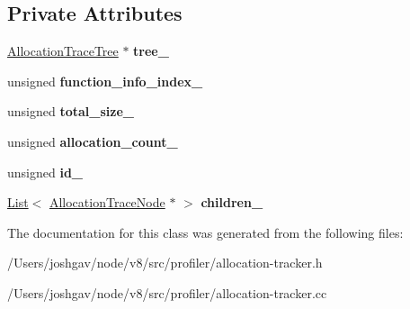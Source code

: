 \subsection*{Private Attributes}
\begin{DoxyCompactItemize}
\item 
\hyperlink{classv8_1_1internal_1_1_allocation_trace_tree}{Allocation\+Trace\+Tree} $\ast$ {\bfseries tree\+\_\+}\hypertarget{classv8_1_1internal_1_1_allocation_trace_node_a1e3fa25a87aaa44042b54073123edc7b}{}\label{classv8_1_1internal_1_1_allocation_trace_node_a1e3fa25a87aaa44042b54073123edc7b}

\item 
unsigned {\bfseries function\+\_\+info\+\_\+index\+\_\+}\hypertarget{classv8_1_1internal_1_1_allocation_trace_node_a70d789a2c7edffb1f96b0d9d539e6210}{}\label{classv8_1_1internal_1_1_allocation_trace_node_a70d789a2c7edffb1f96b0d9d539e6210}

\item 
unsigned {\bfseries total\+\_\+size\+\_\+}\hypertarget{classv8_1_1internal_1_1_allocation_trace_node_a25c93ade36d5ce7dd45eb65dee6c168f}{}\label{classv8_1_1internal_1_1_allocation_trace_node_a25c93ade36d5ce7dd45eb65dee6c168f}

\item 
unsigned {\bfseries allocation\+\_\+count\+\_\+}\hypertarget{classv8_1_1internal_1_1_allocation_trace_node_ab5762ad1769ff5844cb73e544a78dcd3}{}\label{classv8_1_1internal_1_1_allocation_trace_node_ab5762ad1769ff5844cb73e544a78dcd3}

\item 
unsigned {\bfseries id\+\_\+}\hypertarget{classv8_1_1internal_1_1_allocation_trace_node_a188a73ce1d741181cf90866f5f095e65}{}\label{classv8_1_1internal_1_1_allocation_trace_node_a188a73ce1d741181cf90866f5f095e65}

\item 
\hyperlink{classv8_1_1internal_1_1_list}{List}$<$ \hyperlink{classv8_1_1internal_1_1_allocation_trace_node}{Allocation\+Trace\+Node} $\ast$ $>$ {\bfseries children\+\_\+}\hypertarget{classv8_1_1internal_1_1_allocation_trace_node_af2a1f30b035e6d6e61260957c862cda1}{}\label{classv8_1_1internal_1_1_allocation_trace_node_af2a1f30b035e6d6e61260957c862cda1}

\end{DoxyCompactItemize}


The documentation for this class was generated from the following files\+:\begin{DoxyCompactItemize}
\item 
/\+Users/joshgav/node/v8/src/profiler/allocation-\/tracker.\+h\item 
/\+Users/joshgav/node/v8/src/profiler/allocation-\/tracker.\+cc\end{DoxyCompactItemize}

